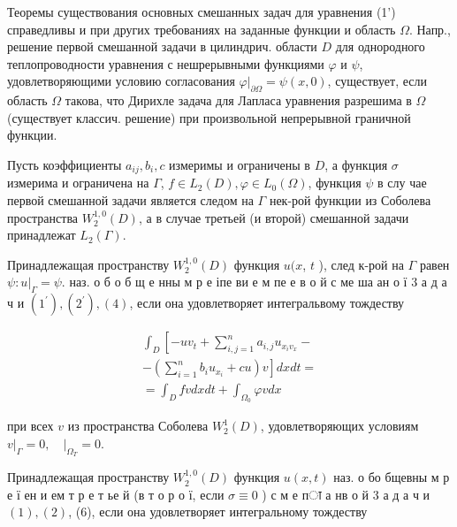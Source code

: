 \documentclass[10pt]{article}
\begin{document}
Теоремы существования основных смешанных задач для уравнения (1') справедливы и при других требованиях на заданные функции и область $\Omega$. Напр., решение первой смешанной задачи в цилиндрич. области $D$ для однородного теплопроводности уравнения с нешрерывными функциями $\varphi$ и $\psi$, удовлетворяющими условию согласования $\left.\varphi\right|_{\partial \Omega}=\psi(x, 0)$, существует, если область $\Omega$ такова, что Дирихле задача для Лапласа уравнения разрешима в $\Omega$ (существует классич. решение) при произвольной непрерывной граничной функции.



Пусть коэффициенты $a_{i j}, b_{i}, c$ измеримы и ограничены в $D$, а функция $\sigma$ измерима и ограничена на $\Gamma$, $f \in L_{2}(D), \varphi \in L_{0}(\Omega)$, функция $\psi$ в слу чае первой смешанной задачи является следом на $\Gamma$ нек-рой функции из Соболева пространства $W_{2}^{1,0}(D)$, а в случае третьей (и второй) смешанной задачи принадлежат $L_{2}(\Gamma)$.



Принадлежащая пространству $W_{2}^{1,0}(D)$ функция $u(x$, $t$ ), след к-рой на $\Gamma$ равен $\psi:\left.u\right|_{\Gamma}=\psi$. наз. о б о б щ е нны м р е іпе ви е м пе е в о й с ме ша ан о ї 3 а д а ч и $\left(1^{\prime}\right),\left(2^{\prime}\right),(4)$, если она удовлетворяет интегральвому тождеству



\[

\begin{gathered}

\int_{D}\left[-u v_{t}+\sum_{i, j=1}^{n} a_{i, j} u_{x_{i} v_{x}}-\right. \\

\left.-\left(\sum_{i=1}^{n} b_{i} u_{x_{i}}+c u\right) v\right] d x d t= \\

=\int_{D} f v d x d t+\int_{\Omega_{0}} \varphi v d x

\end{gathered}

\]



при всех $v$ из пространства Соболева $W_{2}^{1}(D)$, удовлетворяющих условиям $\left.v\right|_{\Gamma}=0,\left.\quad\right|_{\Omega_{T}}=0$.



Принадлежащая пространству $W_{2}^{1,0}(D)$ функция $u(x, t)$ наз. о бо бщевны м р е ї ен и ем т р е т ье й (в т о р о ї, если $\sigma \equiv 0$ ) с м е пा а нв о й 3 а д а ч и $(1),(2)$, (6), если она удовлетворяет интегральному тождеству
\end{document}
